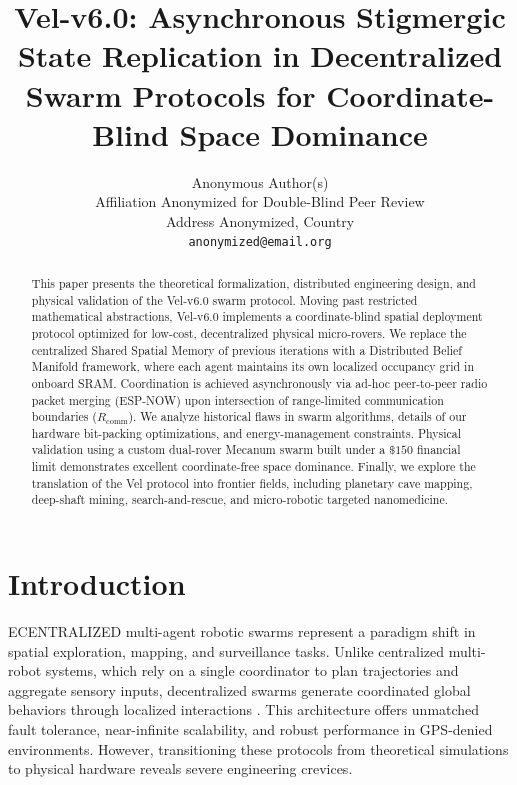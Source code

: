 \documentclass[letterpaper, 10pt, conference]{IEEEtran}
\renewcommand{\IEEEPARstart}[2]{\noindent{\fontsize{26pt}{28pt}\selectfont #1}\MakeUppercase{#2}}
\begin{document}
\title{\LARGE \bf Vel-v6.0: Asynchronous Stigmergic State Replication in Decentralized Swarm Protocols for Coordinate-Blind Space Dominance}

\author{
    Anonymous Author(s) \\
    Affiliation Anonymized for Double-Blind Peer Review \\
    Address Anonymized, Country \\
    \texttt{anonymized@email.org}
}

\maketitle
\thispagestyle{empty}
\pagestyle{empty}

\begin{abstract}
This paper presents the theoretical formalization, distributed engineering design, and physical validation of the Vel-v6.0 swarm protocol. Moving past restricted mathematical abstractions, Vel-v6.0 implements a coordinate-blind spatial deployment protocol optimized for low-cost, decentralized physical micro-rovers. We replace the centralized Shared Spatial Memory of previous iterations with a Distributed Belief Manifold framework, where each agent maintains its own localized occupancy grid in onboard SRAM. Coordination is achieved asynchronously via ad-hoc peer-to-peer radio packet merging (ESP-NOW) upon intersection of range-limited communication boundaries ($R_{\text{comm}}$). We analyze historical flaws in swarm algorithms, details of our hardware bit-packing optimizations, and energy-management constraints. Physical validation using a custom dual-rover Mecanum swarm built under a $\$150$ financial limit demonstrates excellent coordinate-free space dominance. Finally, we explore the translation of the Vel protocol into frontier fields, including planetary cave mapping, deep-shaft mining, search-and-rescue, and micro-robotic targeted nanomedicine.
\end{abstract}

\section{Introduction}
\label{sec:intro}

\IEEEPARstart{D}{ecentralized} multi-agent robotic swarms represent a paradigm shift in spatial exploration, mapping, and surveillance tasks. Unlike centralized multi-robot systems, which rely on a single coordinator to plan trajectories and aggregate sensory inputs, decentralized swarms generate coordinated global behaviors through localized interactions \cite{brambilla2013review}. This architecture offers unmatched fault tolerance, near-infinite scalability, and robust performance in GPS-denied environments. However, transitioning these protocols from theoretical simulations to physical hardware reveals severe engineering crevices. 
\end{document}
